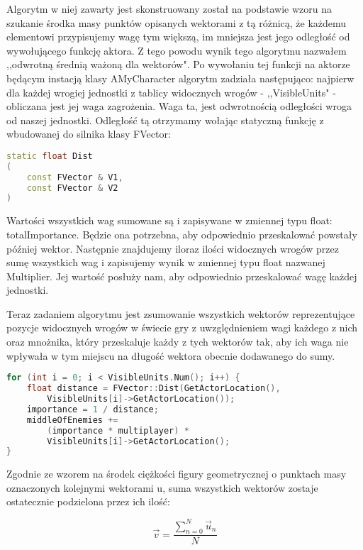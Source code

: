 \documentclass[12pt]{report}
\begin{document}
Algorytm w niej zawarty jest skonstruowany został na podstawie wzoru na szukanie środka masy punktów opisanych wektorami z tą różnicą, że każdemu elementowi przypisujemy wagę tym większą, im mniejsza jest jego odległość od wywołującego funkcję aktora. Z tego powodu wynik tego algorytmu nazwałem ,,odwrotną średnią ważoną dla wektorów". Po wywołaniu tej funkcji na aktorze będącym instacją klasy AMyCharacter algorytm zadziała następująco:
najpierw dla każdej wrogiej jednostki z tablicy widocznych wrogów - ,,VisibleUnits" - obliczana jest jej waga zagrożenia. Waga ta, jest odwrotnością odległości wroga od naszej jednostki. Odległość tą otrzymamy wołając statyczną funkcję z wbudowanej do silnika klasy FVector:

\begin{lstlisting}[language=C++, backgroundcolor=\color{black!5}, basicstyle=\footnotesize, caption=Deklaracja funkcji Dist() w klasie FVector]
static float Dist
(
    const FVector & V1,
    const FVector & V2
)
\end{lstlisting}
Wartości wszystkich wag sumowane są i zapisywane w zmiennej typu float: totalImportance. Będzie ona potrzebna, aby odpowiednio przeskalować powstały później wektor. Następnie znajdujemy iloraz ilości widocznych wrogów przez sumę wszystkich wag i zapisujemy wynik w zmiennej typu float nazwanej Multiplier. Jej wartość posłuży nam, aby odpowiednio przeskalować wagę każdej jednostki.

Teraz zadaniem algorytmu jest zsumowanie wszystkich wektorów reprezentujące pozycje widocznych wrogów w świecie gry z uwzględnieniem wagi każdego z nich oraz mnożnika, który przeskaluje każdy z tych wektorów tak, aby ich waga nie wpływała w tym miejscu na długość wektora obecnie dodawanego do sumy.
\begin{lstlisting}[language=C++, backgroundcolor=\color{black!5}, basicstyle=\footnotesize, caption=Pętla sumująca wektory pozycji wrogów z uwzględnieniem ich wag]
for (int i = 0; i < VisibleUnits.Num(); i++) {
    float distance = FVector::Dist(GetActorLocation(), 
        VisibleUnits[i]->GetActorLocation());
	importance = 1 / distance;
	middleOfEnemies += 
	    (importance * multiplayer) *  
	    VisibleUnits[i]->GetActorLocation();
}
\end{lstlisting}

Zgodnie ze wzorem na środek ciężkości figury geometrycznej o punktach masy oznaczonych kolejnymi wektorami u, suma wszystkich wektorów zostaje ostatecznie podzielona przez ich ilość:

$$\vec v = \dfrac{\sum_{n=0}^{N}  \vec u_n}{N}   $$
\end{document}

